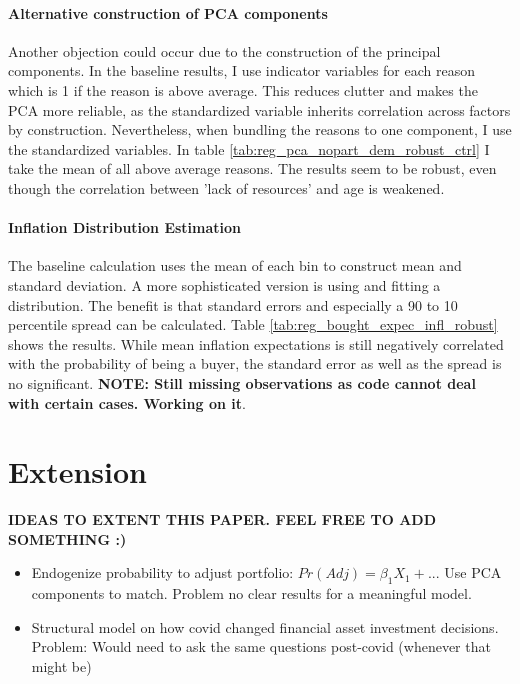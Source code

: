\documentclass[ProjectABM]{subfiles}
\begin{document}
\paragraph{Alternative construction of PCA components}
Another objection could occur due to the construction of the principal components. In the baseline results, I use indicator variables for each reason which is 1 if the reason is above average. This reduces clutter and makes the PCA more reliable, as the standardized variable inherits correlation across factors by construction. Nevertheless, when bundling the reasons to one component, I use the standardized variables. In table \ref{tab:reg_pca_nopart_dem_robust_ctrl} I take the mean of all above average reasons. The results seem to be robust, even though the correlation between 'lack of resources' and age is weakened.  

\paragraph{Inflation Distribution Estimation}
The baseline calculation uses the mean of each bin to construct mean and standard deviation. A more sophisticated version is using \cite{engelberg_manski_2009distribution} and fitting a distribution. The benefit is that standard errors and especially a 90 to 10 percentile spread can be calculated. Table \ref{tab:reg_bought_expec_infl_robust} shows the results. While mean inflation expectations is still negatively correlated with the probability of being a buyer, the standard error as well as the spread is no significant. \textbf{NOTE: Still missing observations as code cannot deal with certain cases. Working on it}.

\section{Extension}
\textbf{IDEAS TO EXTENT THIS PAPER. FEEL FREE TO ADD SOMETHING :)}
\begin{itemize}
	\item Endogenize probability to adjust portfolio: $Pr(Adj) = \beta_1 X_1 + ...$ Use PCA components to match. Problem no clear results for a meaningful model.
	\item Structural model on how covid changed financial asset investment decisions. Problem: Would need to ask the same questions post-covid (whenever that might be)
\end{itemize}
\end{document}

